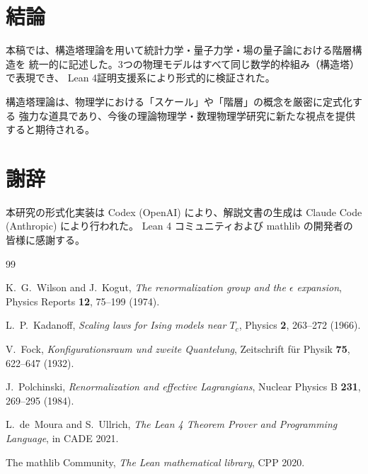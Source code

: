 \documentclass[a4paper,12pt]{ltjsarticle}
\theoremstyle{definition}
\begin{document}
\section{結論}

本稿では、構造塔理論を用いて統計力学・量子力学・場の量子論における階層構造を
統一的に記述した。3つの物理モデルはすべて同じ数学的枠組み（構造塔）で表現でき、
Lean 4証明支援系により形式的に検証された。

構造塔理論は、物理学における「スケール」や「階層」の概念を厳密に定式化する
強力な道具であり、今後の理論物理学・数理物理学研究に新たな視点を提供すると期待される。

\section*{謝辞}

本研究の形式化実装は Codex (OpenAI) により、解説文書の生成は Claude Code (Anthropic) により行われた。
Lean 4 コミュニティおよび mathlib の開発者の皆様に感謝する。

\begin{thebibliography}{99}

K.~G.~Wilson and J.~Kogut,
\textit{The renormalization group and the $\epsilon$ expansion},
Physics Reports \textbf{12}, 75--199 (1974).

L.~P.~Kadanoff,
\textit{Scaling laws for Ising models near $T_c$},
Physics \textbf{2}, 263--272 (1966).

V.~Fock,
\textit{Konfigurationsraum und zweite Quantelung},
Zeitschrift für Physik \textbf{75}, 622--647 (1932).

J.~Polchinski,
\textit{Renormalization and effective Lagrangians},
Nuclear Physics B \textbf{231}, 269--295 (1984).

L.~de~Moura and S.~Ullrich,
\textit{The Lean 4 Theorem Prover and Programming Language},
in CADE 2021.

The mathlib Community,
\textit{The Lean mathematical library},
CPP 2020.

\end{thebibliography}
\end{document}
